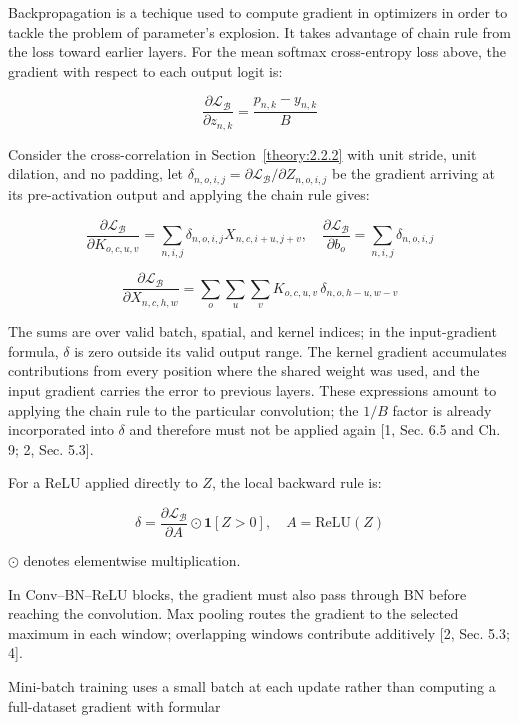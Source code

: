Backpropagation is a techique used to compute gradient in optimizers in order to tackle the problem of parameter's explosion. It takes advantage of chain rule from the loss toward earlier layers. For the mean softmax cross-entropy loss above, the gradient with respect to each output logit is:

\[
\frac{\partial {\mathcal{L}}_{\mathcal{B}}}{\partial {z}_{n,k}}=\frac{{p}_{n,k}-{y}_{n,k}}{B}
\]

Consider the cross-correlation in Section~\ref{theory:2.2.2} with unit stride, unit dilation, and no padding, let \({\delta }_{n,o,i,j}=\partial {\mathcal{L}}_{\mathcal{B}}/\partial {Z}_{n,o,i,j}\) be the gradient arriving at its pre-activation output and applying the chain rule gives:

\[
\frac{\partial {\mathcal{L}}_{\mathcal{B}}}{\partial {K}_{o,c,u,v}}=\sum _{n,i,j} {\delta }_{n,o,i,j}{X}_{n,c,i+u,j+v},\quad \frac{\partial {\mathcal{L}}_{\mathcal{B}}}{\partial {b}_{o}}=\sum _{n,i,j} {\delta }_{n,o,i,j}
\]

\[
\frac{\partial {\mathcal{L}}_{\mathcal{B}}}{\partial {X}_{n,c,h,w}}=\sum _{o} \sum _{u} \sum _{v} {K}_{o,c,u,v}\,{\delta }_{n,o,h-u,w-v}
\]

The sums are over valid batch, spatial, and kernel indices; in the input-gradient formula, \(\delta\) is zero outside its valid output range. The kernel gradient accumulates contributions from every position where the shared weight was used, and the input gradient carries the error to previous layers. These expressions amount to applying the chain rule to the particular convolution; the \(1/B\) factor is already incorporated into \(\delta\) and therefore must not be applied again [1, Sec. 6.5 and Ch. 9; 2, Sec. 5.3].

For a ReLU applied directly to \(Z\), the local backward rule is:

\[
\delta =\frac{\partial {\mathcal{L}}_{\mathcal{B}}}{\partial A}\odot \boldsymbol{1}[Z>0],\quad A=\mathrm{ReLU}(Z)
\]

\(\odot \) denotes elementwise multiplication.

In Conv--BN--ReLU blocks, the gradient must also pass through BN before reaching the convolution. Max pooling routes the gradient to the selected maximum in each window; overlapping windows contribute additively [2, Sec. 5.3; 4].

Mini-batch training uses a small batch at each update rather than computing a full-dataset gradient with formular

